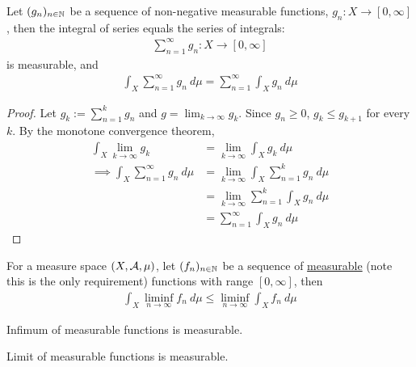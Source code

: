 \documentclass[11pt]{article}
\numberwithin{equation}{section}
\begin{document}
	\begin{corollary}
		Let $(g_n)_{n \in \mathbb{N}}$ be a sequence of non-negative measurable functions, $g_n: X \to [0, \infty]$, then the integral of series equals the series of integrals:
		\begin{align}
			\sum_{n=1}^\infty g_n: X \to [0, \infty]
		\end{align}
		is measurable, and
		\begin{align}
			\int_X \sum_{n=1}^\infty g_n\ d\mu = \sum_{n=1}^\infty \int_X g_n\ d\mu
		\end{align}
	\end{corollary}
	
	\begin{proof}
		Let $g_k := \sum_{n=1}^k g_n$ and $g = \lim_{k \to \infty} g_k$. Since $g_n \geq 0$, $g_k \leq g_{k+1}$ for every $k$. By the monotone convergence theorem,
		\begin{align}
			\int_X \lim_{k\to\infty} g_k &= \lim_{k\to \infty} \int_X g_k\ d\mu \\
			\implies \int_X \sum_{n=1}^\infty g_n\ d\mu &= \lim_{k \to \infty} \int_X \sum_{n=1}^k  g_n\ d\mu \\
			&= \lim_{k \to \infty} \sum_{n=1}^k \int_X g_n\ d\mu \\
			&= \sum_{n=1}^\infty \int_X g_n\ d\mu
		\end{align}
	\end{proof}

	\begin{lemma}\label{fatous}
		For a measure space $(X, \mathcal{{A}}, \mu)$, let $(f_n)_{n \in \mathbb{N}}$ be a sequence of \ul{measurable} (note this is the only requirement) functions with range $[0, \infty]$, then
		\begin{align}
			\int_X \liminf_{n \to \infty} f_n\ d\mu \leq \liminf_{n \to \infty} \int_X f_n\ d\mu
		\end{align}
	\end{lemma}

	\begin{proposition}
		Infimum of measurable functions is measurable.
	\end{proposition}
	
	\begin{proposition}
		Limit of measurable functions is measurable.
	\end{proposition}
	
\end{document}
